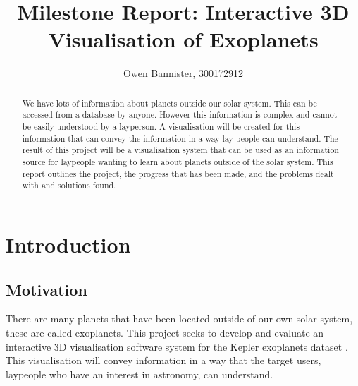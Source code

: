 \documentclass[11pt
              , a4paper
              , twoside
              , openright
              ]{report}
\title{Milestone Report: Interactive 3D Visualisation of Exoplanets}
\author{Owen Bannister, 300172912}
\date{}
\begin{document}
\frontmatter



\begin{abstract}

We have lots of information about planets outside our solar system.
This can be accessed from a database by anyone. However this information is
complex and cannot be easily understood by a layperson. A visualisation will be
created for this information that can convey the information in a way lay people
can understand. The result of this project will be a visualisation system that
can
be used as an information source for laypeople wanting to learn about planets
outside of the solar system. This report outlines the project, the progress that
has been made, and the problems dealt with and solutions found.

\end{abstract}


\maketitle


\tableofcontents



\mainmatter


\chapter{Introduction}
\section{Motivation}
There are many planets that have been located outside of our own solar system,
these are called exoplanets. This project seeks to develop and evaluate an
interactive 3D visualisation software system for the Kepler exoplanets dataset
\cite{dataset}.  This visualisation will convey information in a way that the
target users, laypeople who have an interest in astronomy, can understand.
\end{document}
